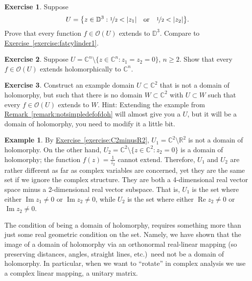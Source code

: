 \documentclass[12pt,openany]{book}
\newcommand{\avoidbreak}{\postdisplaypenalty=100}
\renewcommand{\Re}{\operatorname{Re}}
\renewcommand{\Im}{\operatorname{Im}}
\newcommand{\sabs}[1]{\lvert {#1} \rvert}
\newcommand{\C}{{\mathbb{C}}}
\newcommand{\R}{{\mathbb{R}}}
\newcommand{\D}{{\mathbb{D}}}
\newcommand{\sO}{{\mathscr{O}}}
\theoremstyle{plain}
\theoremstyle{remark}
\theoremstyle{definition}
\newenvironment{exbox}{%
    \def\FrameCommand{\vrule width 1pt \relax\hspace{10pt}}%
    \MakeFramed{\advance\hsize-\width\FrameRestore}%
}{%
    \endMakeFramed
}
\theoremstyle{exercise}
\newtheorem{exercise}{Exercise}[section]
\theoremstyle{example}
\newtheorem{example}[thm]{Example}
\newcommand{\exerciseref}[1]{\hyperref[#1]{Exercise~\ref*{#1}}}
\newcommand{\remarkref}[1]{\hyperref[#1]{Remark~\ref*{#1}}}
\begin{document}
\begin{exbox}
\begin{exercise} \label{exercise:fatcylinder2}
Suppose
\begin{equation*}
U = \bigl\{ z \in \D^3 :
\nicefrac{1}{2} < \sabs{z_1} \quad\text{or}\quad
\nicefrac{1}{2} < \sabs{z_2} \bigr\} .
\avoidbreak
\end{equation*}
Prove that every function $f \in \sO(U)$ extends to $\D^3$.
Compare to \exerciseref{exercise:fatcylinder1}.
\end{exercise}

\begin{exercise} \label{exercise:codim2extends}
Suppose $U = \C^n \setminus \{ z \in \C^n : z_1 = z_2 = 0 \}$, $n
\geq 2$.  Show that every $f \in \sO(U)$ extends holomorphically to
$\C^n$.
\end{exercise}


\begin{exercise} \label{exercise:notsimpledefofdoh}
Construct an example domain $U \subset \C^2$ that is not a domain of
holomorphy, but such that there is no domain $W \subset \C^2$ with $U
\subset W$ such that every $f \in \sO(U)$ extends to $W$.
Hint: Extending the example from \remarkref{remark:notsimpledefofdoh} will
almost give you a $U$, but it will be a domain of holomorphy, you need to modify it
a little bit.
\end{exercise}
\end{exbox}

\begin{example}
By
\exerciseref{exercise:C2minusR2},
$U_1 = \C^2 \setminus \R^2$
is not a domain of holomorphy.  On the other hand,
$U_2 = \C^2 \setminus \{ z \in \C^2 : z_2 = 0 \}$ is a domain of holomorphy;
the function $f(z) = \frac{1}{z_2}$ cannot extend.
Therefore, $U_1$ and $U_2$ are rather different as far as complex variables are
concerned, yet they are the same set if we ignore the complex structure.
They are both a 4-dimensional real vector space minus a 2-dimensional
real vector subspace.  That is, $U_1$ is the set
where either $\Im z_1 \not= 0$ or $\Im z_2 \not= 0$,
while $U_2$ is the set
where either $\Re z_2 \not= 0$ or $\Im z_2 \not= 0$.

The condition of being a domain of holomorphy,
requires something more than just some real geometric condition on the
set.  Namely, we have shown that the image of a domain of holomorphy
via an orthonormal real-linear mapping
(so preserving distances, angles, straight lines,
etc.)\ need not be a domain of holomorphy.  In particular, when we want to
``rotate'' in complex analysis we use a complex linear mapping,
a unitary matrix.
\end{example}
\end{document}
